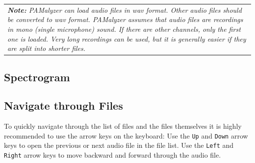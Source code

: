 \documentclass{scrartcl}
\begin{document}
\begin{table}[ht!]
	\centering
	\begin{tabular}{p{}}
		\textit{\textbf{Note:} PAMalyzer can load audio files in wav format. Other audio files should be converted to wav format. PAMalyzer assumes that audio files are recordings in mono (single microphone) sound. If there are other channels, only the first one is loaded. Very long recordings can be used, but it is generally easier if they are split into shorter files.}
	\end{tabular}
\end{table}


\subsection{Spectrogram}\label{sec:spectrogram}

\subsection{Navigate through Files}\label{sec:Navigation}


To quickly navigate through the list of files and the files themselves it is highly recommended to use the arrow keys on the keyboard:
Use the \texttt{Up} and \texttt{Down} arrow keys to open the previous or next audio file in the file list.
Use the \texttt{Left} and \texttt{Right} arrow keys to move backward and forward through the audio file.
\end{document}
